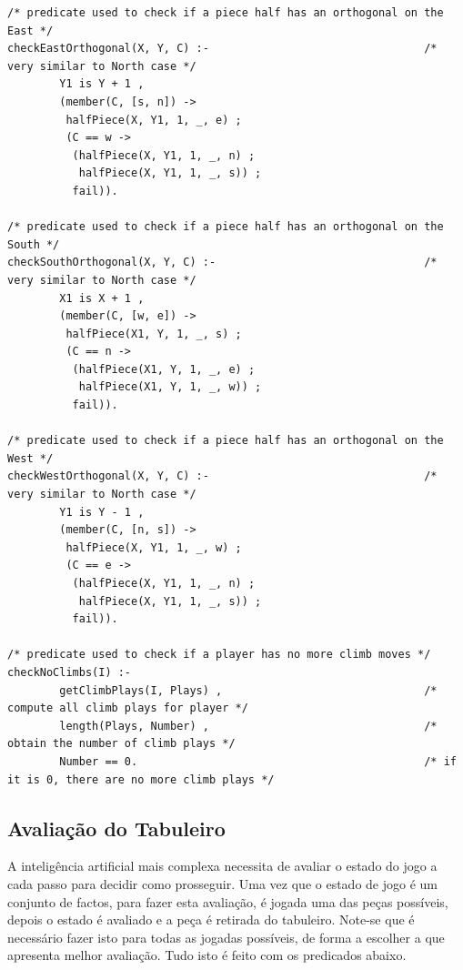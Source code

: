 \documentclass[a4paper]{article}
\begin{document}
\begin{lstlisting}
/* predicate used to check if a piece half has an orthogonal on the East */
checkEastOrthogonal(X, Y, C) :-                                 /* very similar to North case */
        Y1 is Y + 1 , 
        (member(C, [s, n]) -> 
         halfPiece(X, Y1, 1, _, e) ;
         (C == w -> 
          (halfPiece(X, Y1, 1, _, n) ; 
           halfPiece(X, Y1, 1, _, s)) ; 
          fail)).

/* predicate used to check if a piece half has an orthogonal on the South */
checkSouthOrthogonal(X, Y, C) :-                                /* very similar to North case */
        X1 is X + 1 , 
        (member(C, [w, e]) -> 
         halfPiece(X1, Y, 1, _, s) ;
         (C == n -> 
          (halfPiece(X1, Y, 1, _, e) ; 
           halfPiece(X1, Y, 1, _, w)) ; 
          fail)).

/* predicate used to check if a piece half has an orthogonal on the West */
checkWestOrthogonal(X, Y, C) :-                                 /* very similar to North case */
        Y1 is Y - 1 , 
        (member(C, [n, s]) -> 
         halfPiece(X, Y1, 1, _, w) ;
         (C == e -> 
          (halfPiece(X, Y1, 1, _, n) ; 
           halfPiece(X, Y1, 1, _, s)) ; 
          fail)).

/* predicate used to check if a player has no more climb moves */
checkNoClimbs(I) :-                                             
        getClimbPlays(I, Plays) ,                               /* compute all climb plays for player */
        length(Plays, Number) ,                                 /* obtain the number of climb plays */
        Number == 0.                                            /* if it is 0, there are no more climb plays */
\end{lstlisting}


\subsection{Avaliação do Tabuleiro}

A inteligência artificial mais complexa necessita de avaliar o estado do jogo a cada passo para decidir como prosseguir. Uma vez que o estado de jogo é um conjunto de factos, para fazer esta avaliação, é jogada uma das peças possíveis, depois o estado é avaliado e a peça é retirada do tabuleiro. Note-se que é necessário fazer isto para todas as jogadas possíveis, de forma a escolher a que apresenta melhor avaliação. Tudo isto é feito com os predicados abaixo.
\end{document}
